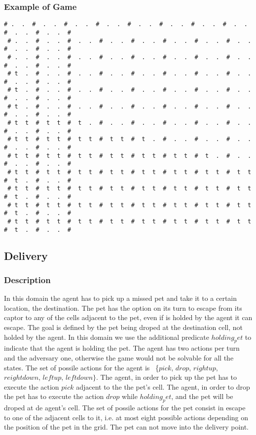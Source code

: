 \documentclass[a4paper]{article}
\begin{document}
\subsubsection{Example of Game}
\begin{Verbatim}[fontsize=\footnotesize]
 # .  .  #  .  .  #  .  .  #  .  .  #  .  .  #  .  .  #  .  .  #  .  .  #  .  .  #  .  .  #
 # .  .  #  .  .  #  .  .  #  .  .  #  .  .  #  .  .  #  .  .  #  .  .  #  .  .  #  .  .  #
 # .  .  #  .  .  #  .  .  #  .  .  #  .  .  #  .  .  #  .  .  #  .  .  #  .  .  #  .  .  #
 # t  .  #  .  .  #  .  .  #  .  .  #  .  .  #  .  .  #  .  .  #  .  .  #  .  .  #  .  .  #
 # t  .  #  .  .  #  .  .  #  .  .  #  .  .  #  .  .  #  .  .  #  .  .  #  .  .  #  .  .  #
 # t  .  #  .  .  #  .  .  #  .  .  #  .  .  #  .  .  #  .  .  #  .  .  #  .  .  #  .  .  #
 # t  t  #  t  t  #  t  .  #  .  .  #  .  .  #  .  .  #  .  .  #  .  .  #  .  .  #  .  .  #
 # t  t  #  t  t  #  t  t  #  t  t  #  t  .  #  .  .  #  .  .  #  .  .  #  .  .  #  .  .  #
 # t  t  #  t  t  #  t  t  #  t  t  #  t  t  #  t  t  #  t  .  #  .  .  #  .  .  #  .  .  #
 # t  t  #  t  t  #  t  t  #  t  t  #  t  t  #  t  t  #  t  t  #  t  t  #  t  .  #  .  .  #
 # t  t  #  t  t  #  t  t  #  t  t  #  t  t  #  t  t  #  t  t  #  t  t  #  t  .  #  .  .  #
 # t  t  #  t  t  #  t  t  #  t  t  #  t  t  #  t  t  #  t  t  #  t  t  #  t  .  #  .  .  #
 # t  t  #  t  t  #  t  t  #  t  t  #  t  t  #  t  t  #  t  t  #  t  t  #  t  .  #  .  .  #
\end{Verbatim}

\subsection{Delivery}
\subsubsection{Description}

In this domain the agent has to pick up a missed pet and take it to a certain location, the destination. The pet has the option on its turn to escape from its captor to any of the cells adjacent to the pet, even if is holded by the agent it can escape. The goal is defined by the pet being droped at the destination cell, not holded by the agent. In this domain we use the additional predicate $holding_pet$ to indicate that the agent is holding the pet. The agent has two actions per turn and the adversary one, otherwise the game would not be solvable for all the states. The set of possile actions for the agent is ~\{$pick$, $drop$, $rightup$, $reightdown$, $leftup$, $leftdown\}$. The agent, in order to pick up the pet has to execute the action $pick$ adjacent to the the pet's cell. The agent, in order to drop the pet has to execute the action $drop$ while $holding_pet$, and the pet will be droped at de agent's cell. The set of possile actions for the pet consist in escape to one of the adjacent cells to it, i.e. at most eight possible actions depending on the position of the pet in the grid. The pet can not move into the delivery point.
\end{document}
